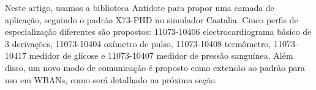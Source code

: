 Neste artigo, usamos a biblioteca Antidote para propor uma camada de aplicação, seguindo o padrão X73-PHD no simulador Castalia. Cinco perfis de especialização diferentes são propostos: 11073-10406 electrocardiograma básico de 3 derivações, 11073-10404 oxímetro de pulso, 11073-10408 termômetro, 11073-10417 medidor de glicose e 11073-10407 medidor de pressão sanguínea. Além disso, um novo modo de comunicação é proposto como extensão ao padrão para uso em WBANs, como será detalhado na próxima seção.

